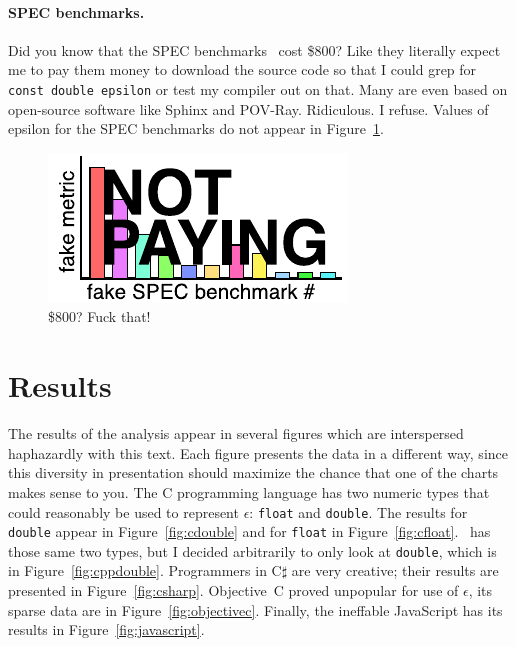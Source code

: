 \documentclass[twocolumn]{article}
\begin{document}
\paragraph{SPEC benchmarks.} Did you know that the SPEC 
benchmarks~\cite{spec2006} cost \$800? Like they literally expect me
to pay them money to download the source code so that I could grep for
{\tt const double epsilon} or test my compiler out on that. Many are
even based on open-source software like Sphinx and POV-Ray.
Ridiculous. I refuse. Values of epsilon for the SPEC benchmarks do not
appear in Figure~\ref{fig:spec}.

\begin{figure}[ht]
\begin{center}
\includegraphics[width=0.99 \linewidth]{spec.pdf}
\end{center}\vspace{-0.1in}
\caption{\$800? Fuck that!}
\label{fig:spec}
\end{figure}

\section{Results}

The results of the analysis appear in several figures which are
interspersed haphazardly with this text. Each figure presents the data
in a different way, since this diversity in presentation should
maximize the chance that one of the charts makes sense to you. The C
programming language has two numeric types that could reasonably be
used to represent $\epsilon$: {\tt float} and {\tt double}. The
results for {\tt double} appear in Figure~\ref{fig:cdouble} and for
{\tt float} in Figure~\ref{fig:cfloat}. \CC\ has those same two types,
but I decided arbitrarily to only look at {\tt double}, which is in
Figure~\ref{fig:cppdouble}. Programmers in C$\sharp$ are very
creative; their results are presented in Figure~\ref{fig:csharp}.
Objective~C proved unpopular for use of $\epsilon$, its sparse data
are in Figure~\ref{fig:objectivec}. Finally, the ineffable JavaScript
has its results in Figure~\ref{fig:javascript}.
\end{document}
